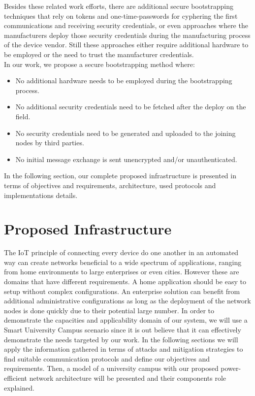 \documentclass{sig-alternate-05-2015}
\begin{document}
Besides these related work efforts, there are additional secure bootstrapping techniques \cite{Fischer2012} that rely on tokens and one-time-passwords for cyphering the first communications and receiving security credentials, or even approaches where the manufacturers deploy those security credentials during the manufacturing process of the device vendor. Still these approaches either require additional hardware to be employed or the need to trust the manufacturer credentials.\\
In our work, we propose a secure bootstrapping method where:
\begin{itemize}
	\item No additional hardware needs to be employed during the bootstrapping process.
	\item No additional security credentials need to be fetched after the deploy on the field. 
	\item No security credentials need to be generated and uploaded to the joining nodes by third parties.
	\item No initial message exchange is sent unencrypted and/or unauthenticated.
\end{itemize}

In the following section, our complete proposed infrastructure is presented in terms of objectives and requirements, architecture, used protocols and implementations details. 

\section{Proposed Infrastructure}
\label{sec:proposed_infrastructure}
The \gls{IoT} principle of connecting every device do one another in an automated way can create networks beneficial to a wide spectrum of applications, ranging from home environments to large enterprises or even cities. However these are domains that have different requirements. A home application should be easy to setup without complex configurations. An enterprise solution can benefit from additional administrative configurations as long as the deployment of the network nodes is done quickly due to their potential large number. In order to demonstrate the capacities and applicability domain of our system, we will use a Smart University Campus scenario since it is out believe that it can effectively demonstrate the needs targeted by our work.
In the following sections we will apply the information gathered in terms of attacks and mitigation strategies to find suitable communication protocols and define our objectives and requirements. Then, a model of a university campus with our proposed power-efficient network architecture will be presented and their components role explained.
\end{document}
